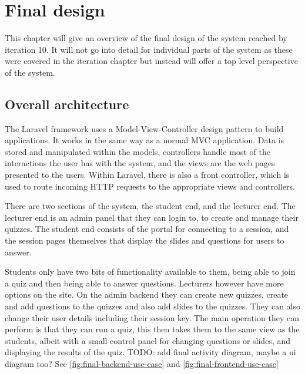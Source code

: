 \chapter{Final design}
This chapter will give an overview of the final design of the system reached by iteration 10. It will not go into detail for individual parts of the system as these were covered in the iteration chapter but instead will offer a top level perspective of the system.

\section{Overall architecture}
The Laravel framework uses a Model-View-Controller design pattern\cite{mvc} to build applications. It works in the same way as a normal MVC application. Data is stored and manipulated within the models, controllers handle most of the interactions the user has with the system, and the views are the web pages presented to the users. Within Laravel, there is also a front controller, which is used to route incoming HTTP requests to the appropriate views and controllers\cite{Laravel-architechture}.

There are two sections of the system, the student end, and the lecturer end. The lecturer end is an admin panel that they can login to, to create and manage their quizzes. The student end consists of the portal for connecting to a session, and the session pages themselves that display the slides and questions for users to answer.

Students only have two bits of functionality available to  them, being able to join a quiz and then being able to answer questions. Lecturers however have more options on the site. On the admin backend they can create new quizzes, create and add questions to the quizzes and also add slides to the quizzes. They can also change their user details including their session key. The main operation they can perform is that they can run a quiz, this then takes them to the same view as the students, albeit with a small control panel for changing questions or slides, and displaying the results of the quiz. TODO: add final activity diagram, maybe a ui diagram too? See \ref{fig:final-backend-use-case} and \ref{fig:final-frontend-use-case}

